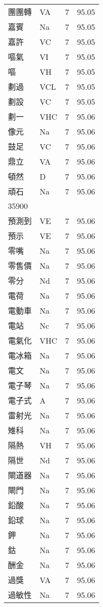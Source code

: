 \documentclass[twocolumn]{book}
\begin{document}
\begin{supertabular}{llrr}
團團轉 & VA & 7 &  95.05\\
嘉賓 & Na & 7 &  95.05\\
嘉許 & VC & 7 &  95.05\\
嘔氣 & VI & 7 &  95.05\\
嘔 & VH & 7 &  95.05\\
劃過 & VCL & 7 &  95.05\\
劃設 & VC & 7 &  95.05\\
劃一 & VHC & 7 &  95.06\\
像元 & Na & 7 &  95.06\\
鼓足 & VC & 7 &  95.06\\
鼎立 & VA & 7 &  95.06\\
頓然 & D & 7 &  95.06\\
頑石 & Na & 7 &  95.06\\
35900\\
預測到 & VE & 7 &  95.06\\
預示 & VE & 7 &  95.06\\
零嘴 & Na & 7 &  95.06\\
零售價 & Na & 7 &  95.06\\
零分 & Nd & 7 &  95.06\\
電荷 & Na & 7 &  95.06\\
電動車 & Na & 7 &  95.06\\
電站 & Nc & 7 &  95.06\\
電氣化 & VHC & 7 &  95.06\\
電冰箱 & Na & 7 &  95.06\\
電文 & Na & 7 &  95.06\\
電子琴 & Na & 7 &  95.06\\
電子式 & A & 7 &  95.06\\
雷射光 & Na & 7 &  95.06\\
雉科 & Na & 7 &  95.06\\
隔熱 & VH & 7 &  95.06\\
隔世 & Nd & 7 &  95.06\\
閘道器 & Na & 7 &  95.06\\
閘門 & Na & 7 &  95.06\\
鉛酸 & Na & 7 &  95.06\\
鉛球 & Na & 7 &  95.06\\
鉀 & Na & 7 &  95.06\\
鈷 & Na & 7 &  95.06\\
酬金 & Na & 7 &  95.06\\
過獎 & VA & 7 &  95.06\\
過敏性 & Na & 7 &  95.06\\

\end{supertabular}
\end{document}
